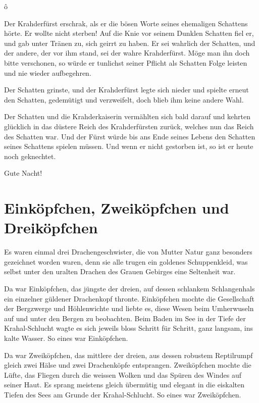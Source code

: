 \documentclass[10pt, a4paper, oneside]{book}
\newcommand{\trennzeichen}{%
        \begin{center}%
            \vspace*{-1em}
            \andorfont\Huge{ô}
        \end{center}
    }
\begin{document}
\trennzeichen



Der Krahderfürst erschrak, als er die bösen Worte seines ehemaligen Schattens hörte. Er wollte nicht sterben! Auf die Knie vor seinem Dunklen Schatten fiel er, und gab unter Tränen zu, sich geirrt zu haben. Er sei wahrlich der Schatten, und der andere, der vor ihm stand, sei der wahre Krahderfürst. Möge man ihn doch bitte verschonen, so würde er tunlichst seiner Pflicht als Schatten Folge leisten und nie wieder aufbegehren.

Der Schatten grinste, und der Krahderfürst legte sich nieder und spielte erneut den Schatten, gedemütigt und verzweifelt, doch blieb ihm keine andere Wahl.

Der Schatten und die Krahderkaiserin vermählten sich bald darauf und kehrten glücklich in das düstere Reich des Krahderfürsten zurück, welches nun das Reich des Schatten war. Und der Fürst würde bis ans Ende seines Lebens den Schatten seines Schattens spielen müssen. Und wenn er nicht gestorben ist, so ist er heute noch geknechtet.\bigskip



Gute Nacht!




\newpage
\section{Einköpfchen, Zweiköpfchen und Dreiköpfchen}



Es waren einmal drei Drachengeschwister, die von Mutter Natur ganz besonders gezeichnet worden waren, denn sie alle trugen ein goldenes Schuppenkleid, was selbst unter den uralten Drachen des Grauen Gebirges eine Seltenheit war.



Da war Einköpfchen, das jüngste der dreien, auf dessen schlankem Schlangenhals ein einzelner güldener Drachenkopf thronte. Einköpfchen mochte die Gesellschaft der Bergzwerge und Höhlenwichte und liebte es, diese Wesen beim Umherwuseln auf und unter den Bergen zu beobachten. Beim Baden im See in der Tiefe der Krahal-Schlucht wagte es sich jeweils bloss Schritt für Schritt, ganz langsam, ins kalte Wasser. So eines war Einköpfchen.



Da war Zweiköpfchen, das mittlere der dreien, aus dessen robustem Reptilrumpf gleich zwei Hälse und zwei Drachenköpfe entsprangen. Zweiköpfchen mochte die Lüfte, das Fliegen durch die weissen Wolken und das Spüren des Windes auf seiner Haut. Es sprang meistens gleich übermütig und elegant in die eiskalten Tiefen des Sees am Grunde der Krahal-Schlucht. So eines war Zweiköpfchen.
\end{document}
